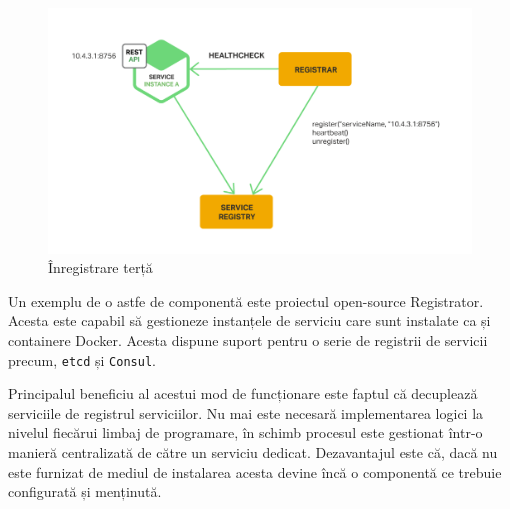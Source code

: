 \documentclass[12pt, a4paper, oneside, romanian]{teza-upb}
\begin{document}
\begin{figure}[ht]
\centering
\includegraphics[scale=0.3]{img/Richardson-microservices-part4-5_third-party-pattern.png}
\caption{Înregistrare terță}
\label{fig:arhi_componente}
\end{figure}

Un exemplu de o astfe de componentă este proiectul open-source Registrator. Acesta este capabil să gestioneze instanțele de serviciu care sunt instalate ca și containere Docker. Acesta dispune suport pentru o serie de registrii de servicii precum, \texttt{etcd} și \texttt{Consul}.

Principalul beneficiu al acestui mod de funcționare este faptul că decuplează serviciile de registrul serviciilor. Nu mai este necesară implementarea logici la nivelul fiecărui limbaj de programare, în schimb procesul este gestionat într-o manieră centralizată de către un serviciu dedicat. Dezavantajul este că, dacă nu este furnizat de mediul de instalarea acesta devine încă o componentă ce trebuie configurată și menținută. 
\end{document}

